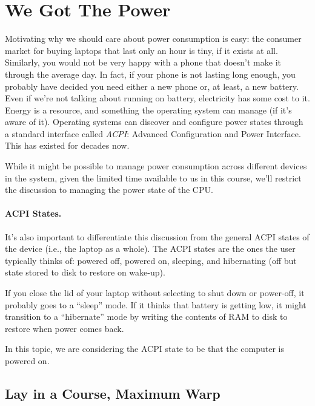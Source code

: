 




\section*{We Got The Power}

Motivating why we should care about power consumption is easy: the consumer market for buying laptops that last only an hour is tiny, if it exists at all. Similarly, you would not be very happy with a phone that doesn't make it through the average day. In fact, if your phone is not lasting long enough, you probably have decided you need either a new phone or, at least, a new battery. Even if we're not talking about running on battery, electricity has some cost to it. Energy is a resource, and something the operating system can manage (if it's aware of it). Operating systems can discover and configure power states through a standard interface called \textit{ACPI}: Advanced Configuration and Power Interface. This has existed for decades now.

While it might be possible to manage power consumption across different devices in the system, given the limited time available to us in this course, we'll restrict the discussion to managing the power state of the CPU. 

\paragraph{ACPI States.} It's also important to differentiate this discussion from the general ACPI states of the device (i.e., the laptop as a whole). The ACPI states are the ones the user typically thinks of: powered off, powered on, sleeping, and hibernating (off but state stored to disk to restore on wake-up). 

If you close the lid of your laptop without selecting to shut down or power-off, it probably goes to a ``sleep'' mode. If it thinks that battery is getting low, it might transition to a ``hibernate'' mode by writing the contents of RAM to disk to restore when power comes back. 

In this topic, we are considering the ACPI state to be that the computer is powered on. 

\subsection*{Lay in a Course, Maximum Warp}

